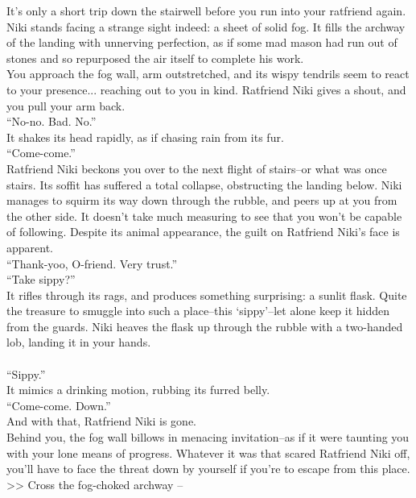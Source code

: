 It’s only a short trip down the stairwell before you run into your ratfriend again. Niki stands facing a strange sight indeed: a sheet of solid fog. It fills the archway of the landing with unnerving perfection, as if some mad mason had run out of stones and so repurposed the air itself to complete his work.\\

You approach the fog wall, arm outstretched, and its wispy tendrils seem to react to your presence... reaching out to you in kind. Ratfriend Niki gives a shout, and you pull your arm back.\\

“No-no. Bad. No.”\\
It shakes its head rapidly, as if chasing rain from its fur.\\

“Come-come.”\\
Ratfriend Niki beckons you over to the next flight of stairs--or what was once stairs. Its soffit has suffered a total collapse, obstructing the landing below. Niki manages to squirm its way down through the rubble, and peers up at you from the other side. It doesn’t take much measuring to see that you won’t be capable of following. Despite its animal appearance, the guilt on Ratfriend Niki’s face is apparent.\\

“Thank-yoo, O-friend. Very trust.”\\

“Take sippy?”\\
It rifles through its rags, and produces something surprising: a sunlit flask. Quite the treasure to smuggle into such a place--this ‘sippy’--let alone keep it hidden from the guards. Niki heaves the flask up through the rubble with a two-handed lob, landing it in your hands.\\
\\

“Sippy.”\\
It mimics a drinking motion, rubbing its furred belly.\\

“Come-come. Down.”\\
And with that, Ratfriend Niki is gone.\\

Behind you, the fog wall billows in menacing invitation--as if it were taunting you with your lone means of progress. Whatever it was that scared Ratfriend Niki off, you’ll have to face the threat down by yourself if you’re to escape from this place.\\

>> Cross the fog-choked archway -- 